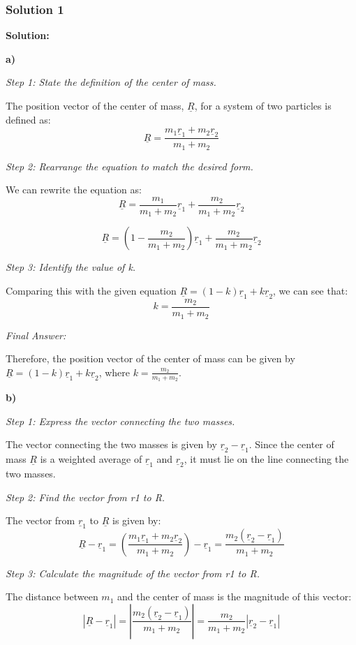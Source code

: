 \documentclass{article}
\begin{document}
\subsubsection{Solution 1}
\textbf{Solution:}

\textbf{a)}

\textit{Step 1: State the definition of the center of mass.}

The position vector of the center of mass, $\underline{R}$, for a system of two particles is defined as:
$$\underline{R} = \frac{m_1 \underline{r}_1 + m_2 \underline{r}_2}{m_1 + m_2}$$

\textit{Step 2: Rearrange the equation to match the desired form.}

We can rewrite the equation as:
$$\underline{R} = \frac{m_1}{m_1 + m_2}\underline{r}_1 + \frac{m_2}{m_1 + m_2}\underline{r}_2$$

$$\underline{R} = \left(1 - \frac{m_2}{m_1 + m_2}\right)\underline{r}_1 + \frac{m_2}{m_1 + m_2}\underline{r}_2$$

\textit{Step 3: Identify the value of k.}

Comparing this with the given equation $\underline{R} = (1-k)\underline{r}_1 + k\underline{r}_2$, we can see that:
$$k = \frac{m_2}{m_1 + m_2}$$

\textit{Final Answer:}

Therefore, the position vector of the center of mass can be given by $\underline{R} = (1-k)\underline{r}_1 + k\underline{r}_2$, where $k = \frac{m_2}{m_1+m_2}$.

\textbf{b)}

\textit{Step 1: Express the vector connecting the two masses.}

The vector connecting the two masses is given by $\underline{r}_2 - \underline{r}_1$. Since the center of mass $\underline{R}$ is a weighted average of $\underline{r}_1$ and $\underline{r}_2$, it must lie on the line connecting the two masses.

\textit{Step 2: Find the vector from r1 to R.}

The vector from $\underline{r}_1$ to $\underline{R}$ is given by:
$$\underline{R} - \underline{r}_1 = \left( \frac{m_1\underline{r}_1 + m_2\underline{r}_2}{m_1 + m_2} \right) - \underline{r}_1 = \frac{m_2(\underline{r}_2 - \underline{r}_1)}{m_1 + m_2}$$

\textit{Step 3: Calculate the magnitude of the vector from r1 to R.}

The distance between $m_1$ and the center of mass is the magnitude of this vector:
$$|\underline{R} - \underline{r}_1| = \left| \frac{m_2(\underline{r}_2 - \underline{r}_1)}{m_1 + m_2} \right| = \frac{m_2}{m_1 + m_2} |\underline{r}_2 - \underline{r}_1|$$
\end{document}

